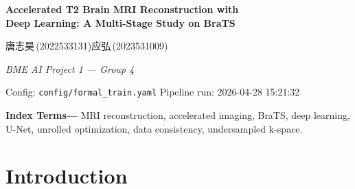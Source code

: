 \documentclass[11pt,a4paper]{article}
\begin{document}
\begin{center}
{\LARGE\bfseries Accelerated T2 Brain MRI Reconstruction with\\[0.15em]
Deep Learning: A Multi-Stage Study on BraTS\par}
\vspace{1.1em}
{\large 唐志昊\,(2022533131)\quad 应弘\,(2023531009)\par}
\vspace{0.35em}
{\normalsize\textit{BME AI Project 1 --- Group 4}\par}
\vspace{0.6em}
{\small Config: \texttt{config/formal\_train.yaml} \quad Pipeline run: 2026-04-28 15:21:32\par}
\end{center}
\vspace{0.8em}

\begin{abstract}
\noindent
Accelerated magnetic resonance imaging (MRI) reconstruction from undersampled k-space is a core problem in parallel and compressed-sensing MRI. This work evaluates a three-stage pipeline on the BraTS glioma dataset: (i) simulation of random variable-density undersampling at acceleration factor AF$=5$; (ii) a supervised U-Net baseline mapping aliased T2 to fully sampled T2; and (iii) a multi-modal unrolled U-Net with explicit k-space data consistency, using undersampled T2 jointly with fully sampled T1. Patient-level splitting avoids leakage across slices from the same subject; intensity normalization applies z-score scaling on non-zero voxels. Quantitatively, the baseline improves peak signal-to-noise ratio (PSNR) from 25.76\,dB to 35.18\,dB and structural similarity (SSIM) from 0.3628 to 0.9271; the unrolled multi-modal model reaches 38.12\,dB PSNR and 0.9660 SSIM, exceeding the baseline by 2.93\,dB PSNR and 0.0389 SSIM. Results support that anatomical guidance from T1 together with data-consistency unrolling yields stronger fidelity than single-modality CNN reconstruction alone.
\end{abstract}

\vspace{0.6em}
\noindent\textbf{Index Terms---}%
MRI reconstruction, accelerated imaging, BraTS, deep learning, U-Net, unrolled optimization, data consistency, undersampled k-space.

\vspace{1em}

\section{Introduction}
\label{sec:intro}
\end{document}
